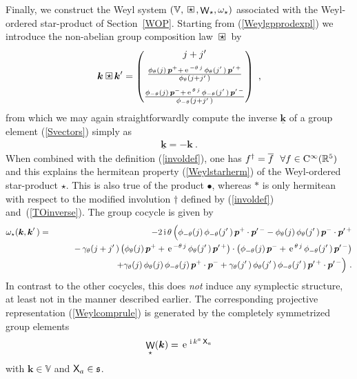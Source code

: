 \documentclass[11pt,a4paper]{article}
\DeclareMathOperator{\weyl}{{\sf W}}                   %
\newcommand{\compc}{\mkern+4mu\square\mkern-17.4mu{\mbox{
    \protect\raisebox{0.2ex}{$\star$}}\mkern+5mu}}      %
\newcommand{\mbf}[1]{{\boldsymbol {#1} }}
\def\ii{{\,{\rm i}\,}}
\def\CC{{\rm C}}
\def\X{{\sf X}}
\def\mk{{\mbf k}}
\def\mbp{{\mbf p}}
\def\mfs{{\mathfrak s}}
\def\mbbV{{\mathbb V}}
\newcommand{\real}{{\mathbb R}} %
\def\e{{\,\rm e}\,}
\def\bea{\begin{eqnarray}}
\def\eea{\end{eqnarray}}
\newcommand{\beq}{\begin{eqnarray}}
\newcommand{\eeq}{\end{eqnarray}}
\begin{document}
Finally, we construct the Weyl system
$(\mbbV,\compc,\weyl_\star,\omega_\star)$ associated with the
Weyl-ordered star-product of Section~\ref{WOP}. Starting from
(\ref{Weylgpprodexpl}) we introduce the non-abelian group composition
law $\compc$ by
\beq
\mk\compc\mk'=\begin{pmatrix}j+j'\,\\[2mm]
\frac{\phi_\theta(j)\,\mbp^++
\e^{-\theta\,j}\,\phi_\theta(j'\,)\,\mbp^{\prime\,+}}
{\phi_\theta(j+j'\,)}\\[3mm]
\frac{\phi_{-\theta}(j)\,\mbp^-+
\e^{\theta\,j}\,\phi_{-\theta}(j'\,)\,\mbp^{\prime\,-}}
{\phi_{-\theta}(j+j'\,)}\end{pmatrix} \ ,
\label{Weylcomplaw}\eeq
from which we may again straightforwardly compute the inverse
$\underline{\mk}$ of a group element (\ref{Svectors}) simply as
\beq
\underline{\mk}=-\mk \ .
\label{Weylinverse}\eeq
When combined with the definition (\ref{involdef}), one has
$f^\dag=\overline{f}~~\forall f\in\CC^\infty(\real^5)$ and this
explains the hermitean property (\ref{Weylstarherm}) of the
Weyl-ordered star-product $\star$. This is also true of the product
$\bullet$, whereas $*$ is only hermitean with respect to the modified
involution $\dag$ defined by (\ref{involdef})
and~(\ref{TOinverse}). The group cocycle is given by
\bea
\omega_\star(\mk,\mk'\,)&=&-2\ii\theta\,\Bigl(
\phi_{-\theta}(j)\,\phi_{-\theta}(j'\,)\,
\mbp^+\cdot\mbp^{\prime\,-}-\phi_{\theta}(j)\,\phi_{\theta}(j'\,)\,
\mbp^-\cdot\mbp^{\prime\,+}\Bigr.\nonumber\\ &&\qquad
-\,\gamma_\theta(j+j'\,)\,\bigl(\phi_\theta(j)\,
\mbp^++\e^{-\theta\,j}\,\phi_\theta(j'\,)\,\mbp^{\prime\,+}\bigr)
\cdot\bigl(\phi_{-\theta}(j)\,
\mbp^-+\e^{\theta\,j}\,\phi_{-\theta}(j'\,)\,
\mbp^{\prime\,-}\bigr)\nonumber\\ &&
\qquad+\Bigl.
\gamma_\theta(j)\,\phi_\theta(j)\,\phi_{-\theta}(j)\,\mbp^+\cdot\mbp^-+
\gamma_\theta(j'\,)\,\phi_\theta(j'\,)\,\phi_{-\theta}(j'\,)\,
\mbp^{\prime\,+}\cdot\mbp^{\prime\,-}
\Bigr) \ .
\label{Weylcocycle}\eea
In contrast to the other cocycles, this does {\it not} induce any
symplectic structure, at least not in the manner described
earlier. The corresponding projective representation
(\ref{Weylcomprule}) is generated by the completely symmetrized group
elements
\beq
\weyl_\star(\mk)=\e^{\ii k^a\,\X_a}
\label{Weylweylop}\eeq
with $\mk\in\mbbV$ and $\X_a\in\mfs$.
\end{document}
